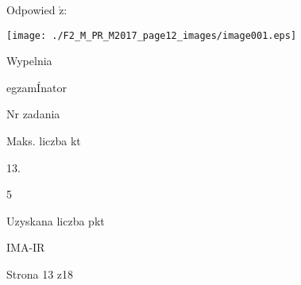 \documentclass[a4paper,12pt]{article}
\begin{document}
Odpowied $\acute{\mathrm{z}}$:
\begin{center}
\texttt{[image: ./F2\_M\_PR\_M2017\_page12\_images/image001.eps]}
\end{center}
Wypelnia

egzamÍnator

Nr zadania

Maks. liczba kt

13.

5

Uzyskana liczba pkt

IMA-IR

Strona 13 z18
\end{document}
